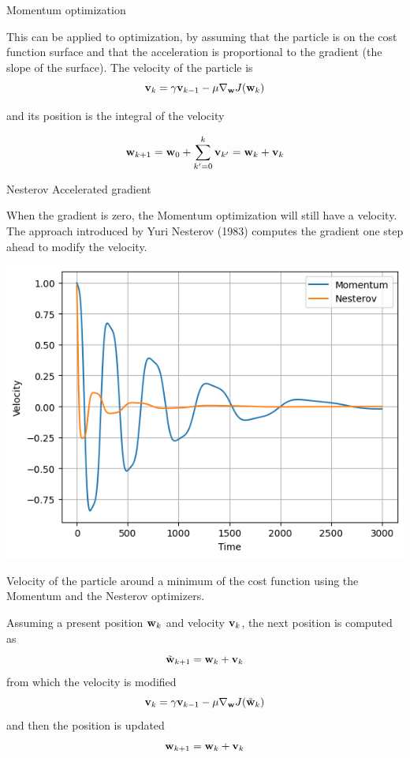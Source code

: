 \documentclass{beamer}
\begin{document}
\begin{frame}{Momentum optimization}

This can be applied to optimization, by assuming that the particle is on the cost function surface and that the acceleration is proportional to the gradient (the slope of the surface). The velocity of the particle is
$$
{\bf v}_{k} = \gamma{\bf v}_{k-1} - \mu \nabla_{{\bf w}} J({\bf w}_{k}) 
$$

and its position is the integral of the velocity

$$
{\bf w}_{k+1} = {\bf w}_0 + \sum_{k'=0}^k {\bf v}_{k'} = {\bf w}_{k} + {\bf v}_k
$$
\end{frame}



\begin{frame}{Nesterov Accelerated gradient}

When the gradient is zero, the Momentum optimization will still have a velocity. The approach introduced by Yuri Nesterov (1983)  computes the gradient one step ahead to modify the velocity. 
\begin{multicols}{2}
\includegraphics[scale=0.3]{Module 1 (NN)/pics/nesterov.png}

Velocity of the particle around a minimum of the cost function using the Momentum and the Nesterov optimizers.

\columnbreak

Assuming a present position ${\bf w}_k$ and velocity ${\bf v}_k$, the next position is computed as  
$$\tilde{{\bf w}}_{k+1}  = {\bf w}_{k} + {\bf v}_k$$
from which the velocity is modified 
    $${\bf v}_k = \gamma {\bf v}_{k-1} - \mu \nabla_{{\bf w}}J(\tilde{{\bf w}}_k)$$ 
and then the position is updated
$$    {\bf w}_{k+1}  = {\bf w}_k + {\bf v}_k $$
\end{multicols}

\end{frame}
\end{document}
